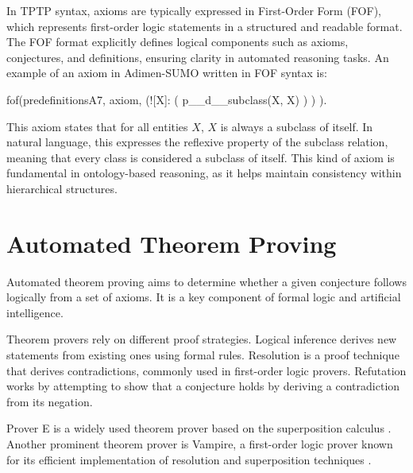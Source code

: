 \documentclass[english,version-2020-11]{uzl-thesis}
\begin{document}
In TPTP syntax, axioms are typically expressed in First-Order Form (FOF), which represents first-order logic statements in a structured and readable format. The FOF format explicitly defines logical components such as axioms, conjectures, and definitions, ensuring clarity in automated reasoning tasks. An example of an axiom in Adimen-SUMO written in FOF syntax is:


\begin{Pseudocode}[morekeywords = {add, create}, deletekeywords={to}, numbers=left,
    caption = {Axiom example Adimen-SUMO}]
    fof(predefinitionsA7, axiom,
        (![X]: 
            (
                p__d__subclass(X, X)
            )
        )
    ).
\end{Pseudocode}



This axiom states that for all entities \( X \), \( X \) is always a subclass of itself. In natural language, this expresses the reflexive property of the subclass relation, meaning that every class is considered a subclass of itself. This kind of axiom is fundamental in ontology-based reasoning, as it helps maintain consistency within hierarchical structures.

\section{Automated Theorem Proving}

Automated theorem proving aims to determine whether a given conjecture follows logically from a set of axioms. It is a key component of formal logic and artificial intelligence.

Theorem provers rely on different proof strategies. Logical inference derives new statements from existing ones using formal rules. Resolution is a proof technique that derives contradictions, commonly used in first-order logic provers. Refutation works by attempting to show that a conjecture holds by deriving a contradiction from its negation.

Prover E is a widely used theorem prover based on the superposition calculus \cite{Schulz2019}. Another prominent theorem prover is Vampire, a first-order logic prover known for its efficient implementation of resolution and superposition techniques \cite{Riazanov2002}.
\end{document}

